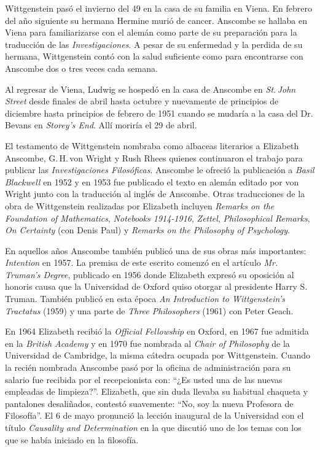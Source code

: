 Wittgenstein pasó el invierno del 49 en la casa de su familia en Viena. En febrero del año siguiente su hermana Hermine murió de cancer. Anscombe se hallaba en Viena para familiarizarse con el alemán como parte de su preparación para la traducción de las \emph{Investigaciones}. A pesar de su enfermedad y la perdida de su hermana, Wittgenstein contó con la salud suficiente como para encontrarse con Anscombe dos o tres veces cada semana\autocite[Cf.~][562]{monk1991duty}.

Al regresar de Viena, Ludwig se hospedó en la casa de Anscombe en \emph{St.\,John Street} desde finales de abril hasta octubre y nuevamente de principios de diciembre hasta principios de febrero de 1951 cuando se mudaría a la casa del Dr.\,Bevans en \emph{Storey's End}\autocite[Cf.~][567]{monk1991duty}. Allí moriría el 29 de abril.

El testamento de Wittgenstein nombraba como albaceas literarios a Elizabeth Anscombe, G.\,H.\,von Wright y Rush Rhees quienes continuaron el trabajo para publicar las \emph{Investigaciones Filosóficas}. Anscombe le ofreció la publicación a \emph{Basil Blackwell} en 1952 y en 1953 fue publicado el texto en alemán editado por von Wright junto con la traducción al inglés de Anscombe. Otras traducciones de la obra de Wittgenstein realizadas por Elizabeth incluyen \emph{Remarks on the Foundation of Mathematics}, \emph{Notebooks 1914-1916}, \emph{Zettel}, \emph{Philosophical Remarks}, \emph{On Certainty} (con Denis Paul) y \emph{Remarks on the Philosophy of Psychology}\autocite[Cf.~][38]{teichman2002fellows}.

En aquellos años Anscombe también publicó una de sus obras más importantes: \emph{Intention} en 1957. La premisa de este escrito comenzó en el artículo \emph{Mr. Truman's Degree}, publicado en 1956 donde Elizabeth expresó su oposición al honoris causa que la Universidad de Oxford quiso otorgar al presidente Harry S. Truman\autocite[Cf.~][101]{grimi2014dl}. También publicó en esta época \emph{An Introduction to Wittgenstein's Tractatus} (1959) y una parte de \emph{Three Philosophers} (1961) con Peter Geach\autocite[Cf.~][39]{teichman2002fellows}.

En 1964 Elizabeth recibió la \emph{Official Fellowship} en Oxford, en 1967 fue admitida en la \emph{British Academy} y en 1970 fue nombrada al \emph{Chair of Philosophy} de la Universidad de Cambridge, la misma cátedra ocupada por Wittgenstein. Cuando la recién nombrada Anscombe pasó por la oficina de administración para su salario fue recibida por el recepcionista con: \enquote{¿Es usted una de las nuevas empleadas de limpieza?}. Elizabeth, que sin duda llevaba su habitual chaqueta y pantalones desaliñados, contestó suavemente: \enquote{No, soy la nueva Profesora de Filosofía}\autocite[Cf.~][37]{teichman2002fellows}. El 6 de mayo pronunció la lección inaugural de la Universidad con el título \emph{Causality and Determination} en la que discutió uno de los temas con los que se había iniciado en la filosofía.

